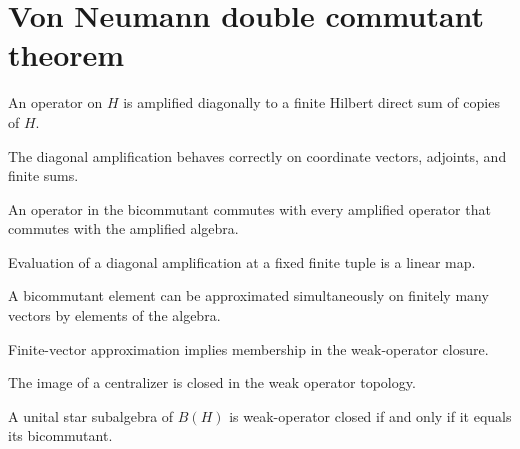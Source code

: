 \section{Von Neumann double commutant theorem}

\begin{definition}
\label{def:vndc-diag}
\leanok
An operator on $H$ is amplified diagonally to a finite Hilbert direct sum of copies of $H$.
\end{definition}

\begin{lemma}
\label{lem:vndc-diag}
\leanok
{}
The diagonal amplification behaves correctly on coordinate vectors, adjoints, and finite sums.
\end{lemma}

\begin{lemma}
\label{lem:vndc-bicommutant}
\leanok
{}
An operator in the bicommutant commutes with every amplified operator that commutes with the amplified algebra.
\end{lemma}

\begin{definition}
\label{def:vndc-eval}
\leanok
Evaluation of a diagonal amplification at a fixed finite tuple is a linear map.
\end{definition}

\begin{lemma}
\label{lem:vndc-finite}
\leanok
{}
A bicommutant element can be approximated simultaneously on finitely many vectors by elements of the algebra.
\end{lemma}

\begin{lemma}
\label{lem:vndc-wot}
\leanok
{}
Finite-vector approximation implies membership in the weak-operator closure.
\end{lemma}

\begin{lemma}
\label{lem:vndc-centralizer}
\leanok
The image of a centralizer is closed in the weak operator topology.
\end{lemma}

\begin{theorem}
\label{thm:von-neumann-double-commutant}
\leanok
{}
A unital star subalgebra of $B(H)$ is weak-operator closed if and only if it equals its bicommutant.
\end{theorem}
